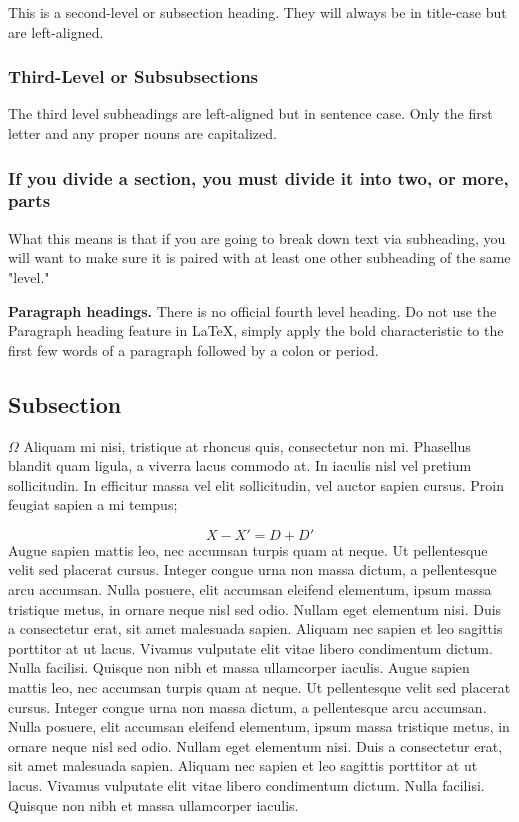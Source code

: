 This is a second-level or subsection heading. They will always be in title-case but are left-aligned. 

\subsubsection{Third-Level or Subsubsections}
The third level subheadings are left-aligned but in sentence case. Only the first letter and any proper nouns are capitalized. 

\subsubsection{If you divide a section, you must divide it into two, or more, parts}
What this means is that if you are going to break down text via subheading, you will want to make sure it is paired with at least one other subheading of the same "level." 

{\bf Paragraph headings.} There is no official fourth level heading. Do not use the Paragraph heading feature in LaTeX, simply apply the bold characteristic to the first few words of a paragraph followed by a colon or period.

\subsection{Subsection}

\(\Omega\) Aliquam mi nisi, tristique at rhoncus quis, consectetur non mi. Phasellus blandit quam ligula, a viverra lacus commodo at. In iaculis nisl vel pretium sollicitudin. In efficitur massa vel elit sollicitudin, vel auctor sapien cursus. Proin feugiat sapien a mi tempus;

\begin{equation}
       X-X'=D+D' 
\end{equation}
Augue sapien mattis leo, nec accumsan turpis quam at neque. Ut pellentesque velit sed
placerat cursus. Integer congue urna non massa dictum, a pellentesque arcu accumsan. Nulla
posuere, elit accumsan eleifend elementum, ipsum massa tristique metus, in ornare neque nisl sed
odio. Nullam eget elementum nisi. Duis a consectetur erat, sit amet malesuada sapien. Aliquam
nec sapien et leo sagittis porttitor at ut lacus. Vivamus vulputate elit vitae libero condimentum
dictum. Nulla facilisi. Quisque non nibh et massa ullamcorper iaculis.
Augue sapien mattis leo, nec accumsan turpis quam at neque. Ut pellentesque velit sed
placerat cursus. Integer congue urna non massa dictum, a pellentesque arcu accumsan. Nulla
posuere, elit accumsan eleifend elementum, ipsum massa tristique metus, in ornare neque nisl sed
odio. Nullam eget elementum nisi. Duis a consectetur erat, sit amet malesuada sapien. Aliquam
nec sapien et leo sagittis porttitor at ut lacus. Vivamus vulputate elit vitae libero condimentum
dictum. Nulla facilisi. Quisque non nibh et massa ullamcorper iaculis.


